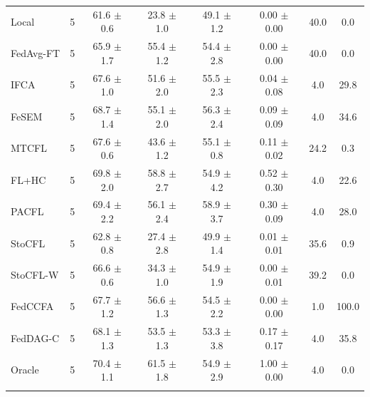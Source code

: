 {{\begin{tabular}{l r c c c c c c}
Local & 5 & 61.6 $\pm$ 0.6 & 23.8 $\pm$ 1.0 & 49.1 $\pm$ 1.2 & 0.00 $\pm$ 0.00 & 40.0 & 0.0 \\
FedAvg-FT & 5 & 65.9 $\pm$ 1.7 & 55.4 $\pm$ 1.2 & 54.4 $\pm$ 2.8 & 0.00 $\pm$ 0.00 & 40.0 & 0.0 \\
IFCA & 5 & 67.6 $\pm$ 1.0 & 51.6 $\pm$ 2.0 & 55.5 $\pm$ 2.3 & 0.04 $\pm$ 0.08 & 4.0 & 29.8 \\
FeSEM & 5 & 68.7 $\pm$ 1.4 & 55.1 $\pm$ 2.0 & 56.3 $\pm$ 2.4 & 0.09 $\pm$ 0.09 & 4.0 & 34.6 \\
MTCFL & 5 & 67.6 $\pm$ 0.6 & 43.6 $\pm$ 1.2 & 55.1 $\pm$ 0.8 & 0.11 $\pm$ 0.02 & 24.2 & 0.3 \\
FL+HC & 5 & 69.8 $\pm$ 2.0 & 58.8 $\pm$ 2.7 & 54.9 $\pm$ 4.2 & 0.52 $\pm$ 0.30 & 4.0 & 22.6 \\
PACFL & 5 & 69.4 $\pm$ 2.2 & 56.1 $\pm$ 2.4 & 58.9 $\pm$ 3.7 & 0.30 $\pm$ 0.09 & 4.0 & 28.0 \\
StoCFL & 5 & 62.8 $\pm$ 0.8 & 27.4 $\pm$ 2.8 & 49.9 $\pm$ 1.4 & 0.01 $\pm$ 0.01 & 35.6 & 0.9 \\
StoCFL-W & 5 & 66.6 $\pm$ 0.6 & 34.3 $\pm$ 1.0 & 54.9 $\pm$ 1.9 & 0.00 $\pm$ 0.01 & 39.2 & 0.0 \\
FedCCFA & 5 & 67.7 $\pm$ 1.2 & 56.6 $\pm$ 1.3 & 54.5 $\pm$ 2.2 & 0.00 $\pm$ 0.00 & 1.0 & 100.0 \\
FedDAG-C & 5 & 68.1 $\pm$ 1.3 & 53.5 $\pm$ 1.3 & 53.3 $\pm$ 3.8 & 0.17 $\pm$ 0.17 & 4.0 & 35.8 \\
Oracle & 5 & 70.4 $\pm$ 1.1 & 61.5 $\pm$ 1.8 & 54.9 $\pm$ 2.9 & 1.00 $\pm$ 0.00 & 4.0 & 0.0 \\
\addlinespace
\bottomrule
\end{tabular}}
}

